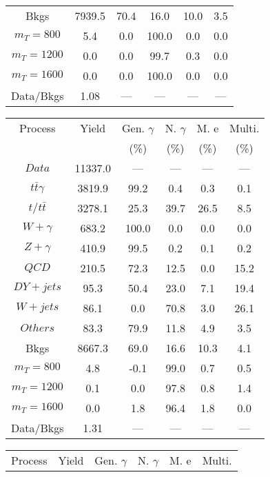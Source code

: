 \begin{figure}
\begin{minipage}[c]{0.32\textwidth}
{\begin{tabular}{cccccc}
Bkgs &  7939.5 &  70.4 &  16.0 &  10.0 &  3.5\\
$ m_{T} = 800 $ &  5.4 &  0.0 &  100.0 &  0.0 &  0.0\\
$ m_{T} = 1200 $ &  0.0 &  0.0 &  99.7 &  0.3 &  0.0\\
$ m_{T} = 1600 $ &  0.0 &  0.0 &  100.0 &  0.0 &  0.0\\
Data/Bkgs &  1.08 &  --- &  --- &  --- &  ---\\
\hline
\end{tabular}
}
\end{minipage}
\begin{minipage}[c]{0.32\textwidth}
\centering
\tiny{
\begin{tabular}{cccccc}
\hline
Process & Yield & Gen. $\gamma$ & N. $\gamma$ & M. e & Multi. \\
 &  & (\%) & (\%) & (\%) & (\%)  \\
\hline
                                                                      $ Data $ &  11337.0 &  --- &  --- &  --- &  ---\\
$ t\bar{t}\gamma $ &  3819.9 &  99.2 &  0.4 &  0.3 &  0.1\\
$ t/t\bar{t} $ &  3278.1 &  25.3 &  39.7 &  26.5 &  8.5\\
$ W+\gamma $ &  683.2 &  100.0 &  0.0 &  0.0 &  0.0\\
$ Z+\gamma $ &  410.9 &  99.5 &  0.2 &  0.1 &  0.2\\
$ QCD $ &  210.5 &  72.3 &  12.5 &  0.0 &  15.2\\
$ DY+jets $ &  95.3 &  50.4 &  23.0 &  7.1 &  19.4\\
$ W+jets $ &  86.1 &  0.0 &  70.8 &  3.0 &  26.1\\
$ Others $ &  83.3 &  79.9 &  11.8 &  4.9 &  3.5\\
Bkgs &  8667.3 &  69.0 &  16.6 &  10.3 &  4.1\\
$ m_{T} = 800 $ &  4.8 &  -0.1 &  99.0 &  0.7 &  0.5\\
$ m_{T} = 1200 $ &  0.1 &  0.0 &  97.8 &  0.8 &  1.4\\
$ m_{T} = 1600 $ &  0.0 &  1.8 &  96.4 &  1.8 &  0.0\\
Data/Bkgs &  1.31 &  --- &  --- &  --- &  ---\\
\hline
\end{tabular}
}
\end{minipage}
\begin{minipage}[c]{0.32\textwidth}
\centering
\tiny{
\begin{tabular}{cccccc}
\hline
Process & Yield & Gen. $\gamma$ & N. $\gamma$ & M. e & Multi. \\

\end{tabular}}
\end{minipage}
\end{figure}
